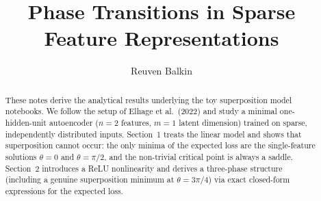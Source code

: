 \documentclass[a4paper]{article}
\title{Phase Transitions in Sparse Feature Representations}
\author{Reuven Balkin}
\begin{document}
\maketitle

\makeatother
\noindent
\newcommand{\dif}{\mathtext{d}}

\begin{abstract}
These notes derive the analytical results underlying the toy superposition model notebooks. We follow the setup of Elhage et al.\ (2022) and study a minimal one-hidden-unit autoencoder ($n=2$ features, $m=1$ latent dimension) trained on sparse, independently distributed inputs. Section~1 treats the linear model and shows that superposition cannot occur: the only minima of the expected loss are the single-feature solutions $\theta=0$ and $\theta=\pi/2$, and the non-trivial critical point is always a saddle. Section~2 introduces a ReLU nonlinearity and derives a three-phase structure (including a genuine superposition minimum at $\theta=3\pi/4$) via exact closed-form expressions for the expected loss.
\end{abstract}
\end{document}
